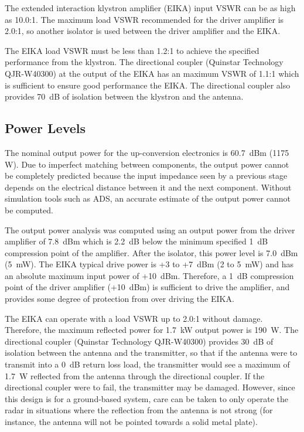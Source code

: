 \documentclass[12pt,letterpaper]{article}
\begin{document}
The extended interaction klystron amplifier (EIKA) input VSWR can be
as high as 10.0:1. The maximum load VSWR recommended for the driver
amplifier is 2.0:1, so another isolator is used between the driver
amplifier and the EIKA.

The EIKA load VSWR must be less than 1.2:1 to achieve the specified
performance from the klystron. The directional coupler (Quinstar
Technology QJR-W40300) at the output of the EIKA has an maximum VSWR
of 1.1:1 which is sufficient to ensure good performance the EIKA. The
directional coupler also provides 70~dB of isolation between the
klystron and the antenna.

\subsection{Power Levels}

The nominal output power for the up-conversion electronics is 60.7~dBm
(1175 W). Due to imperfect matching between components, the output
power cannot be completely predicted because the input impedance seen
by a previous stage depends on the electrical distance between it and
the next component. Without simulation tools such as ADS, an accurate
estimate of the output power cannot be computed.

The output power analysis was computed using an output power from the
driver amplifier of 7.8~dBm which is 2.2~dB below the minimum
specified 1~dB compression point of the amplifier. After the isolator,
this power level is 7.0~dBm (5~mW). The EIKA typical drive power is +3
to +7~dBm (2 to 5~mW) and has an absolute maximum input power of
+10~dBm. Therefore, a 1~dB compression point of the driver amplifier
(+10~dBm) is sufficient to drive the amplifier, and provides some
degree of protection from over driving the EIKA.

The EIKA can operate with a load VSWR up to 2.0:1 without
damage. Therefore, the maximum reflected power for 1.7~kW output power
is 190~W. The directional coupler (Quinstar Technology QJR-W40300)
provides 30~dB of isolation between the antenna and the transmitter,
so that if the antenna were to transmit into a 0~dB return loss load,
the transmitter would see a maximum of 1.7~W reflected from the
antenna through the directional coupler. If the directional coupler
were to fail, the transmitter may be damaged. However, since this
design is for a ground-based system, care can be taken to only operate
the radar in situations where the reflection from the antenna is not
strong (for instance, the antenna will not be pointed towards a solid
metal plate).
\end{document}
